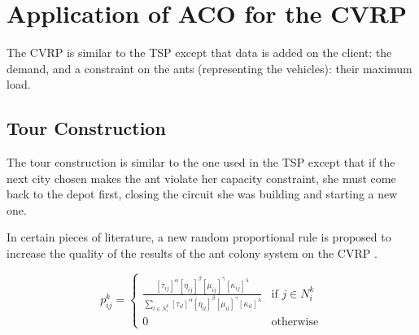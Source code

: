 \section{Application of ACO for the CVRP}\label{applicvrp}
The CVRP is similar to the TSP except that data is added on the client: the demand, and a constraint on the ants (representing the vehicles): their maximum load. 

\subsection{Tour Construction}\label{tourCVRP}
The tour construction is similar to the one used in the TSP except that if the next city chosen makes the ant violate her capacity constraint, she must come back to the depot first, closing the circuit she was building and starting a new one.

In certain pieces of literature, a new random proportional rule is proposed to increase the quality of the results of the ant colony system on the CVRP \cite{bullnheimer1999applying}.

\begin{equation}
	p_{ij}^k =
	\begin{cases}
		\frac{[\tau_{ij}]^\alpha [\eta_{ij}]^\beta [\mu_{ij}]^\gamma [\kappa_{ij}]^\lambda}{\sum_{l\in N_i^k}{[\tau_{il}]^\alpha [\eta_{il}]^\beta [\mu_{il}]^\gamma [\kappa_{il}]^\lambda}} & \text{if } j\in N_i^k\\
		0 & \text{otherwise}
	\end{cases}
	\label{eq:cvrp proportional rule}
\end{equation}

